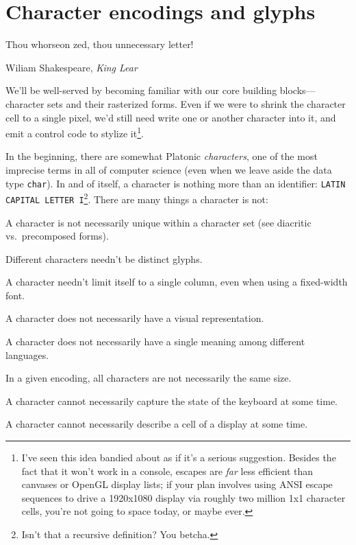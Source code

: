 \section{Character encodings and glyphs}\label{section:unicode}
\label{sec:charsets}
\epigraph{Thou whorseon zed, thou unnecessary letter!}{Wiliam Shakespeare, \textit{King Lear}}

We'll be well-served by becoming familiar with our core building
blocks---character sets and their rasterized forms. Even if we were to shrink
the character cell to a single pixel, we'd still need write one or another
character into it, and emit a control code to stylize it\footnote{I've seen
this idea bandied about as if it's a serious suggestion. Besides the fact
that it won't work in a console, escapes are \textit{far} less efficient than
canvases or OpenGL display lists; if your plan involves using ANSI escape
sequences to drive a 1920x1080 display via roughly two million 1x1 character
cells, you're not going to space today, or maybe ever\cite{upgoerfive}.}.

In the beginning, there are somewhat Platonic \textit{characters}, one of the
most imprecise terms in all of computer science (even when we leave aside the
data type \texttt{char}). In and of itself, a character is nothing more than an
identifier: \texttt{LATIN CAPITAL LETTER I}\footnote{Isn't that a recursive
definition? You betcha.}. There are many things a character is not:

\begin{denseitemize}
\item{A character is not necessarily unique within a character set (see diacritic vs.\ precomposed forms).}
\item{Different characters needn't be distinct glyphs\cite{nothinggoesaway}.}
\item{A character needn't limit itself to a single column, even when using a fixed-width font.}
\item{A character does not necessarily have a visual representation.}
\item{A character does not necessarily have a single meaning among different languages.}
\item{In a given encoding, all characters are not necessarily the same size.}
\item{A character cannot necessarily capture the state of the keyboard at some time.}
\item{A character cannot necessarily describe a cell of a display at some time.}
\end{denseitemize}

